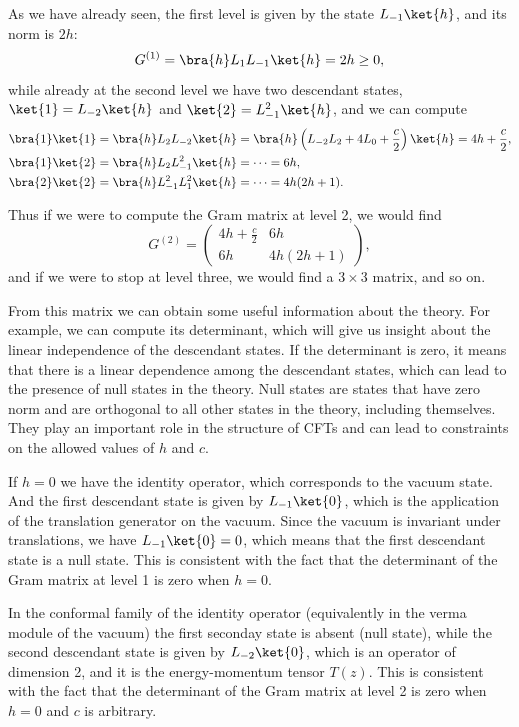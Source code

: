 As we have already seen, the first level is given by the state \(L_{-1} \ket{h}\), and its norm is \(2h\):
\[
    G^{(1)} = \bra{h} L_1 L_{-1} \ket{h} = 2h \geq 0,
\]
while already at the second level we have two descendant states, \(\ket{1} = L_{-2} \ket{h}\) and \(\ket{2} = L_{-1}^2 \ket{h}\), and we can compute
\[
    \begin{aligned}
        \bra{1}\ket{1} & = \bra{h} L_{2}L_{-2} \ket{h} = \bra{h} \left(L_{-2}L_2 + 4L_0 + \frac{c}{2}\right)\ket{h} = 4h + \frac{c}{2}, \\
        \bra{1}\ket{2} & = \bra{h} L_{2}L_{-1}^2 \ket{h} = \dots = 6h,                                                                  \\
        \bra{2}\ket{2} & = \bra{h} L_{-1}^2 L_1^2 \ket{h} = \dots = 4h(2h + 1).
    \end{aligned}
\]

Thus if we were to compute the Gram matrix at level 2, we would find
\[
    G^{(2)} = \begin{pmatrix}
        4h + \frac{c}{2} & 6h         \\
        6h               & 4h(2h + 1)
    \end{pmatrix},
\]
and if we were to stop at level three, we would find a \(3 \times 3\) matrix, and so on.

From this matrix we can obtain some useful information about the theory. For example, we can compute its determinant, which will give us insight about the linear independence of the descendant states. If the determinant is zero, it means that there is a linear dependence among the descendant states, which can lead to the presence of null states in the theory. Null states are states that have zero norm and are orthogonal to all other states in the theory, including themselves. They play an important role in the structure of CFTs and can lead to constraints on the allowed values of \(h\) and \(c\).

If \(h=0\) we have the identity operator, which corresponds to the vacuum state. And the first descendant state is given by \(L_{-1} \ket{0}\), which is the application of the translation generator on the vacuum. Since the vacuum is invariant under translations, we have \(L_{-1} \ket{0} = 0\), which means that the first descendant state is a null state. This is consistent with the fact that the determinant of the Gram matrix at level 1 is zero when \(h=0\).

In the conformal family of the identity operator (equivalently in the verma module of the vacuum) the first seconday state is absent (null state), while the second descendant state is given by \(L_{-2} \ket{0}\), which is an operator of dimension 2, and it is the energy-momentum tensor \(T(z)\). This is consistent with the fact that the determinant of the Gram matrix at level 2 is zero when \(h=0\) and \(c\) is arbitrary.

